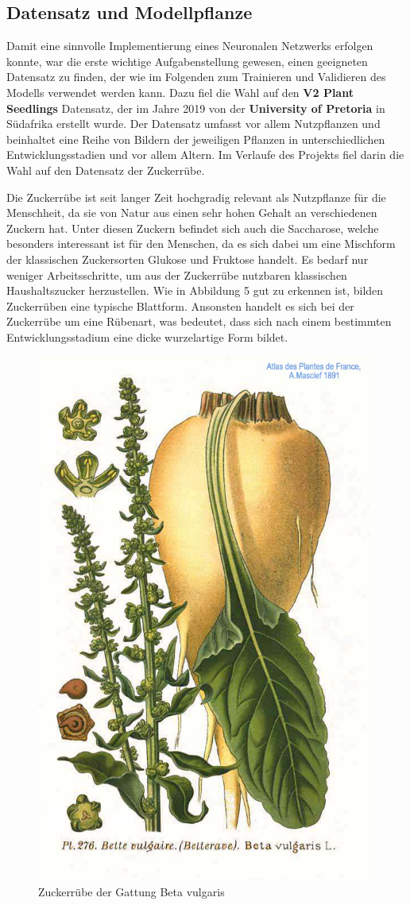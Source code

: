 \subsection{Datensatz und Modellpflanze}
Damit eine sinnvolle Implementierung eines Neuronalen Netzwerks erfolgen konnte, war die erste wichtige Aufgabenstellung gewesen, einen geeigneten Datensatz zu finden, der wie im Folgenden zum Trainieren und Validieren des Modells verwendet werden kann. Dazu fiel die Wahl auf den \textbf{V2 Plant Seedlings} Datensatz, der im Jahre 2019 von der \textbf{University of Pretoria} in Südafrika erstellt wurde. Der Datensatz umfasst vor allem Nutzpflanzen und beinhaltet eine Reihe von Bildern der jeweiligen Pflanzen in unterschiedlichen Entwicklungsstadien und vor allem Altern. Im Verlaufe des Projekts fiel darin die Wahl auf den Datensatz der Zuckerrübe. \newline \par
Die Zuckerrübe ist seit langer Zeit hochgradig relevant als Nutzpflanze für die Menschheit, da sie von Natur aus einen sehr hohen Gehalt an verschiedenen Zuckern hat. Unter diesen Zuckern befindet sich auch die Saccharose, welche besonders interessant ist für den Menschen, da es sich dabei um eine Mischform der klassischen Zuckersorten Glukose und Fruktose handelt. Es bedarf nur weniger Arbeitsschritte, um aus der Zuckerrübe nutzbaren klassischen Haushaltszucker herzustellen. Wie in Abbildung 5 gut zu erkennen ist, bilden Zuckerrüben eine typische Blattform. Ansonsten handelt es sich bei der Zuckerrübe um eine Rübenart, was bedeutet, dass sich nach einem bestimmten Entwicklungsstadium eine dicke wurzelartige Form bildet.
\begin{figure}
    \centering
    \includegraphics[width=0.4\linewidth]{276_Beta_vulgaris_L.jpg}
    \caption{Zuckerrübe der Gattung Beta vulgaris}
    \label{fig:enter-label}
\end{figure} 
